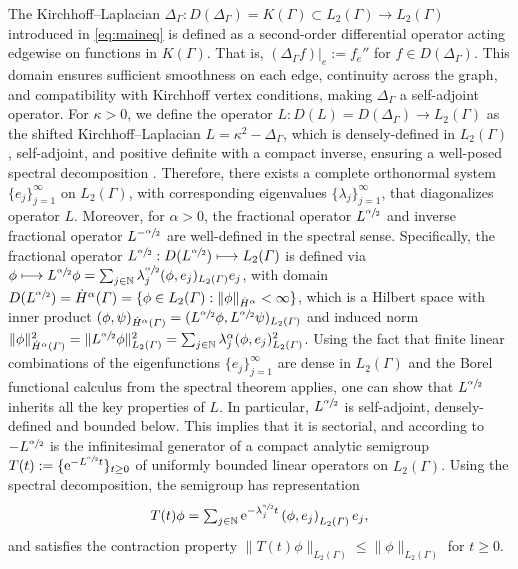 \documentclass[numbers,webpdf]{ima-authoring-template}%
\theoremstyle{thmstyletwo}%
\numberwithin{equation}{section}
\begin{document}
The Kirchhoff--Laplacian $\Delta_{\Gamma}: D(\Delta_{\Gamma}) = K(\Gamma)\subset L_2(\Gamma)\to L_2(\Gamma)$ introduced in \eqref{eq:maineq} is defined as a second-order differential operator acting edgewise on functions in $K(\Gamma)$. That is, $ (\Delta_{\Gamma} f)|_e := f_e''$ for $f\in D(\Delta_{\Gamma})$. This domain ensures sufficient smoothness on each edge, continuity across the graph, and compatibility with Kirchhoff vertex conditions, making $\Delta_{\Gamma}$ a self-adjoint operator. For $\kappa>0$, we define the operator $L:D(L) = D(\Delta_{\Gamma})\to L_2(\Gamma)$ as the shifted Kirchhoff--Laplacian $L =\kappa^2 -\Delta_{\Gamma}$, which is densely-defined in $L_2(\Gamma)$, self-adjoint, and positive definite with a compact inverse, ensuring a well-posed spectral decomposition \cite{berkolaiko2013introduction, bolin2024gaussian}. Therefore, there exists a complete orthonormal system  $\{e_j\}_{j=1}^\infty$ on $L_2(\Gamma)$, with corresponding eigenvalues $\{\lambda_j\}_{j=1}^\infty$, that diagonalizes operator $L$. Moreover, for $\alpha>0$, the fractional operator $L^{\sfrac{\alpha}{2}}$  and inverse fractional operator $L^{-\sfrac{\alpha}{2}}$ are well-defined in the spectral sense. Specifically, the fractional operator $L^{\sfrac{\alpha}{2}} : D(L^{\sfrac{\alpha}{2}}) \longmapsto L_2({\mit\varGamma})$ is defined via $\phi \longmapsto L^{\sfrac{\alpha}{2}}\phi = \sum_{j\in\mathbb{N}}\lambda_j^{\sfrac{\alpha}{2}}(\phi, e_j)_{L_2({\mit\varGamma})}e_j$, with domain $D(L^{\sfrac{\alpha}{2}}) = \dot{H}^{\alpha}({\mit\varGamma}) = \{\phi\in L_2({\mit\varGamma}): \|\phi\|_{\dot{H}^{\alpha}}<\infty\}$, which is a Hilbert space  with inner product $(\phi,\psi)_{\dot{H}^{\alpha}({\mit\varGamma})} = (L^{\sfrac{\alpha}{2}} \phi, L^{\sfrac{\alpha}{2}} \psi)_{L_2({\mit\varGamma})}$ and induced norm $\|\phi\|_{\dot{H}^{\alpha}({\mit\varGamma})}^2 = \|L^{\sfrac{\alpha}{2}} \phi\|^2_{L_2({\mit\varGamma})} = \sum_{j\in\mathbb{N}}\lambda_j^{\alpha}(\phi, e_j)^2_{L_2({\mit\varGamma})}$. Using the fact that finite linear combinations of the eigenfunctions $\{e_j\}_{j=1}^\infty$ are dense in $L_2(\Gamma)$ and the Borel functional calculus from the spectral theorem applies, one can show that $L^{\sfrac{\alpha}{2}}$ inherits all the key properties of $L$. In particular, $L^{\sfrac{\alpha}{2}}$ is self-adjoint, densely-defined and bounded below. This implies that it is sectorial, and according to \cite[Theorem~1.3.4.]{Henry1981} $-L^{\sfrac{\alpha}{2}}$ is the infinitesimal generator of a compact analytic semigroup $T(t) :=\{\mathrm{e}^{-L^{\sfrac{\alpha}{2}}t}\}_{t\geq 0}$ of uniformly bounded linear operators on $L_2(\Gamma)$. Using the spectral decomposition, the semigroup has representation
\begin{align}
\label{spectral_semigroup}
   \textstyle T(t)\phi = \sum_{j\in\mathbb{N}}\mathrm{e}^{-\lambda^{\sfrac{\alpha}{2}}_jt}\left(\phi, e_j\right)_{L_2({\mit\varGamma})}e_j,
\end{align}
and satisfies the contraction property $\|T(t)\phi\|_{L_2(\Gamma)}\leq \|\phi\|_{L_2(\Gamma)}$ for $t\geq0$.
\end{document}
